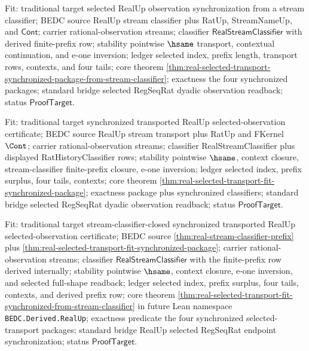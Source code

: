 Fit: traditional target selected RealUp observation synchronization from a
stream classifier; BEDC source RealUp stream classifier plus RatUp,
StreamNameUp, and $\mathsf{Cont}$; carrier rational-observation streams;
classifier $\mathsf{RealStreamClassifier}$ with derived finite-prefix row;
stability pointwise $\hsame$ transport, contextual continuation, and e-one
inversion; ledger selected index, prefix length, transport rows, contexts, and
four tails; core theorem
\autoref{thm:real-selected-transport-synchronized-package-from-stream-classifier};
exactness the four synchronized packages; standard bridge selected RegSeqRat
dyadic observation readback; status $\mathsf{ProofTarget}$.

Fit: traditional target synchronized transported RealUp selected-observation
certificate; BEDC source RealUp stream transport plus RatUp and FKernel
$\Cont$; carrier rational-observation streams; classifier RealStreamClassifier
plus displayed RatHistoryClassifier rows; stability pointwise $\hsame$, context
closure, stream-classifier finite-prefix closure, e-one inversion; ledger
selected index, prefix surplus, four tails, contexts; core theorem
\autoref{thm:real-selected-transport-fit-synchronized-package}; exactness
package plus synchronized classifiers; standard bridge selected RegSeqRat
dyadic observation readback; status $\mathsf{ProofTarget}$.

Fit: traditional target stream-classifier-closed synchronized transported
RealUp selected-observation certificate; BEDC source
\autoref{thm:real-stream-classifier-prefix} plus
\autoref{thm:real-selected-transport-fit-synchronized-package}; carrier
rational-observation streams; classifier $\mathsf{RealStreamClassifier}$ with
the finite-prefix row derived internally; stability pointwise $\hsame$,
context closure, e-one inversion, and selected full-shape readback; ledger
selected index, prefix surplus, four tails, contexts, and derived prefix row;
core theorem
\autoref{thm:real-selected-transport-fit-synchronized-from-stream-classifier}
in future Lean namespace \texttt{BEDC.Derived.RealUp}; exactness predicate the
four synchronized selected-transport packages; standard bridge RealUp selected
RegSeqRat endpoint synchronization; status $\mathsf{ProofTarget}$.
